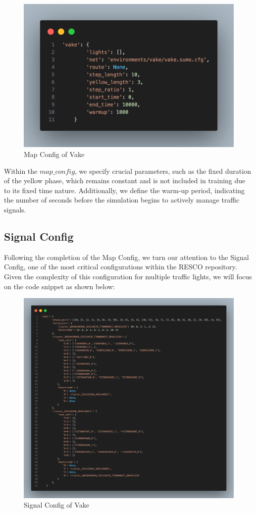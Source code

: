 \begin{figure}[h]
    \centering
    \includegraphics[width=0.8\linewidth]{images/methodology/map-config-vake.png}
    \caption{Map Config of Vake}
    \label{fig:map-config-vake}
\end{figure}

Within the $map\_config$, we specify crucial parameters, such as the fixed duration of the yellow phase, which remains constant and is not included in training due to its fixed time nature. Additionally, we define the warm-up period, indicating the number of seconds before the simulation begins to actively manage traffic signals.

\subsection{Signal Config}
Following the completion of the Map Config, we turn our attention to the Signal Config, one of the most critical configurations within the RESCO repository. Given the complexity of this configuration for multiple traffic lights, we will focus on the code snippet as shown below:

\newpage
\begin{figure}[h]
    \centering
    \includegraphics[width=0.8\linewidth]{images/methodology/signal-config-vake.png}
    \caption{Signal Config of Vake}
    \label{fig:signal-config-vake}
\end{figure}

